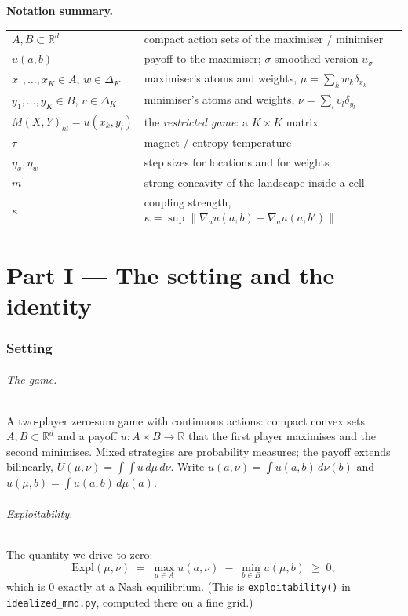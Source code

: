 \documentclass[11pt,a4paper]{article}
\theoremstyle{plain}
\theoremstyle{definition}
\theoremstyle{remark}
\newcommand{\R}{\mathbb{R}}
\newcommand{\Expl}{\mathrm{Expl}}
\newcommand{\simplex}{\Delta}
\newcommand{\norm}[1]{\lVert #1 \rVert}
\begin{document}
\medskip
\noindent\textbf{Notation summary.}
\begin{center}
\begin{tabular}{ll}
$A,B\subset\R^d$ & compact action sets of the maximiser / minimiser\\
$u(a,b)$ & payoff to the maximiser; $\sigma$-smoothed version $u_\sigma$\\
$x_1,\dots,x_K\in A$, $w\in\simplex_K$ & maximiser's atoms and weights, $\mu=\sum_k w_k\delta_{x_k}$\\
$y_1,\dots,y_K\in B$, $v\in\simplex_K$ & minimiser's atoms and weights, $\nu=\sum_l v_l\delta_{y_l}$\\
$M(X,Y)_{kl}=u(x_k,y_l)$ & the \emph{restricted game}: a $K\times K$ matrix\\
$\tau$ & magnet / entropy temperature\\
$\eta_x,\eta_w$ & step sizes for locations and for weights\\
$m$ & strong concavity of the landscape inside a cell\\
$\kappa$ & coupling strength, $\kappa=\sup\norm{\nabla_a u(a,b)-\nabla_a u(a,b')}$\\
\end{tabular}
\end{center}

\newpage
\part*{Part I --- The setting and the identity}

\section{Setting}\label{sec:setting}

\paragraph{The game.} A two-player zero-sum game with continuous actions:
compact convex sets $A,B\subset\R^d$ and a payoff $u:A\times B\to\R$ that the
first player maximises and the second minimises. Mixed strategies are probability
measures; the payoff extends bilinearly,
$U(\mu,\nu)=\int\!\!\int u\,d\mu\,d\nu$. Write $u(a,\nu)=\int u(a,b)\,d\nu(b)$
and $u(\mu,b)=\int u(a,b)\,d\mu(a)$.

\paragraph{Exploitability.} The quantity we drive to zero:
\begin{equation}\label{eq:expl}
\Expl(\mu,\nu) \;=\; \max_{a\in A} u(a,\nu)\;-\;\min_{b\in B} u(\mu,b)\;\ge\;0,
\end{equation}
which is $0$ exactly at a Nash equilibrium. (This is \texttt{exploitability()} in
\texttt{idealized\_mmd.py}, computed there on a fine grid.)
\end{document}

